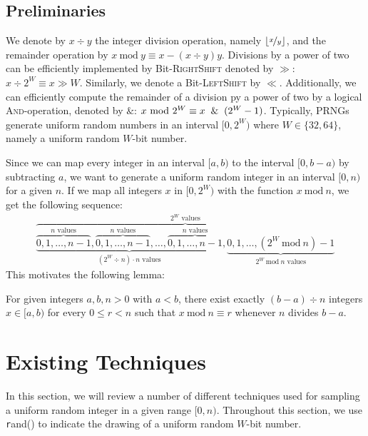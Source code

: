 \documentclass[a4paper, UKenglish, cleveref, autoref, thm-restate]{lipics-v2021}
\newcommand{\Mod}[1]{\ \mathrm{mod}\ #1}
\begin{document}
\subsection{Preliminaries}\label{sec:1.2}
We denote by $x \div y$ the integer division operation, namely $\lfloor\nicefrac{x}{y}\rfloor$, and the remainder operation by $x \Mod y \equiv x - (x \div y)y$. 
Divisions by a power of two can be efficiently implemented by Bit-\textsc{RightShift} denoted by $\gg$: $x \div 2^W \equiv x \gg W$.
Similarly, we denote a Bit-\textsc{LeftShift} by $\ll$.
Additionally, we can efficiently compute the remainder of a division py a power of two by a logical \textsc{And}-operation, denoted by $\&$: $x \Mod 2^W \equiv x \And (2^W - 1)$.
Typically, PRNGs generate uniform random numbers in an interval $[0,2^W)$ where $W \in \{32,64\}$, namely a uniform random $W$-bit number.

Since we can map every integer in an interval $[a,b)$ to the interval $[0,b - a)$ by subtracting $a$, we want to generate a uniform random integer in an interval $[0,n)$ for a given $n$.
If we map all integers $x$ in $[0,2^W)$ with the function $x \Mod n$, we get the following sequence:
{\large
\begin{align}\label{eq:1}
    \overbrace{\underbrace{\overbrace{0,1,\ldots,n - 1}^{\text{$n$ values}},\overbrace{0,1,\ldots,n - 1}^{\text{$n$ values}},\ldots,\overbrace{0,1,\ldots,n - 1}^{\text{$n$ values}}}_{\text{$\left(2^W \div n\right) \cdot n$ values}},\underbrace{0,1,\ldots,\left(2^W \Mod n\right) - 1}_{\text{$2^W \Mod n$ values}}}^{\text{$2^W$ values}}
\end{align}
}%
This motivates the following lemma:
\begin{lemma} \label{lemma:1}
    For given integers $a,b,n > 0$ with $a < b$, there exist exactly $(b - a) \div n$ integers $x \in [a,b)$ for every $0 \leq r < n$ such that $x \Mod n \equiv r$ whenever $n$ divides $b - a$.
\end{lemma}




\section{Existing Techniques}\label{sec:2}
In this section, we will review a number of different techniques used for sampling a uniform random integer in a given range $[0,n)$.
Throughout this section, we use {\texttt rand()} to indicate the drawing of a uniform random $W$-bit number.
\end{document}
